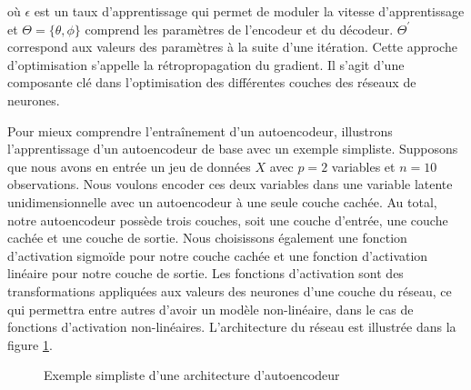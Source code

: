 \noindent où $\epsilon$ est un taux d'apprentissage qui permet de moduler la vitesse d'apprentissage et $\Theta = \{\theta, \phi\}$ comprend les paramètres de l'encodeur et du décodeur. $\Theta^{'}$ correspond aux valeurs des paramètres à la suite d'une itération. Cette approche d'optimisation s'appelle la rétropropagation du gradient. Il s'agit d'une composante clé dans l'optimisation des différentes couches des réseaux de neurones.

Pour mieux comprendre l'entraînement d'un autoencodeur, illustrons l'apprentissage d'un autoencodeur de base avec un exemple simpliste. Supposons que nous avons en entrée un jeu de données $X$ avec $p=2$ variables et $n=10$ observations. Nous voulons encoder ces deux variables dans une variable latente unidimensionnelle avec un autoencodeur à une seule couche cachée. Au total, notre autoencodeur possède trois couches, soit une couche d'entrée, une couche cachée et une couche de sortie. Nous choisissons également une fonction d'activation sigmoïde pour notre couche cachée et une fonction d'activation linéaire pour notre couche de sortie. Les fonctions d'activation sont des transformations appliquées aux valeurs des neurones d'une couche du réseau, ce qui permettra entre autres d'avoir un modèle non-linéaire, dans le cas de fonctions d'activation non-linéaires. L'architecture du réseau est illustrée dans la figure \ref{fig:toyAE}.

\begin{figure}[htb]
	\centering
	\caption{Exemple simpliste d'une architecture d'autoencodeur}
	\label{fig:toyAE}
\end{figure}

